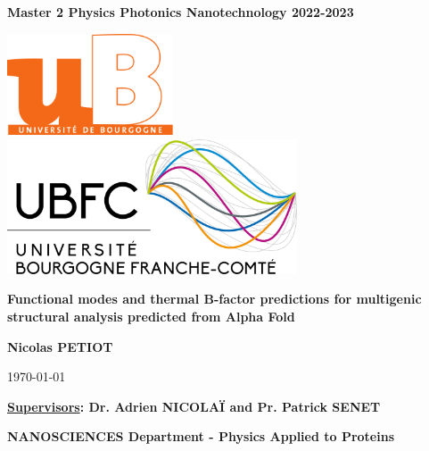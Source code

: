 \begin{titlepage}
	\parindent=0pt
	\bfseries\Large Master 2 Physics Photonics Nanotechnology  2022-2023
	\vspace{1cm}
	
	\begin{center}
		\includegraphics[height=3cm]{images/logo_ub.png}%
		\hfill
		\includegraphics[height=4cm]{images/logo_ubfc.png}%
	\end{center}
	\vspace{1cm}
	\hrulefill
	
	\begin{center}
		\bfseries\huge
		Functional modes and thermal B-factor predictions for multigenic structural analysis predicted from Alpha Fold
	\end{center}
	\hrulefill
	\vspace{.5cm}
	
	\begin{center}
		\bfseries\Large
		Nicolas PETIOT
	\end{center}
	
	\begin{center}
		\normalfont \today
	\end{center}
	\vspace{.25cm}
	
	\begin{center}
		\bfseries\Large
		\underline{Supervisors}: Dr. Adrien NICOLAÏ and Pr. Patrick SENET
	\end{center}
	\vspace{.25cm}
	
	\begin{center}
		\bfseries\Large
		NANOSCIENCES Department - Physics Applied to Proteins
	\end{center}
	\vspace{.25cm}
	

\end{titlepage}
